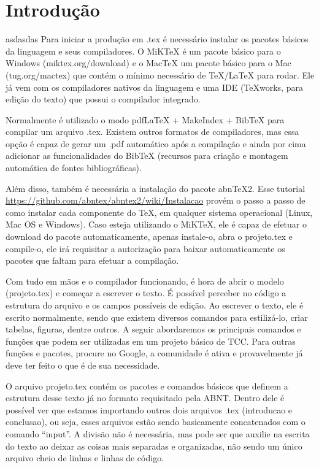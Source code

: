 \chapter{Introdução}
\label{c.introducao}

asdasdas Para iniciar a produção em .tex é necessário instalar os pacotes básicos da linguagem e seus compiladores. O MiKTeX é um pacote básico para o Windows (miktex.org/download) e o MacTeX um pacote básico para o Mac (tug.org/mactex) que contém o mínimo necessário de TeX/LaTeX para rodar. Ele já vem com os compiladores nativos da linguagem e uma IDE (TeXworks, para edição do texto) que possui o compilador integrado.

Normalmente é utilizado o modo pdfLaTeX + MakeIndex + BibTeX para compilar um arquivo .tex. Existem outros formatos de compiladores, mas essa opção é capaz de gerar um .pdf automático após a compilação e ainda por cima adicionar as funcionalidades do BibTeX (recursos para criação e montagem automática de fontes bibliográficas).

Além disso, também é necessária a instalação do pacote abnTeX2. Esse tutorial \url{https://github.com/abntex/abntex2/wiki/Instalacao} provém o passo a passo de como instalar cada componente do TeX, em qualquer sistema operacional (Linux, Mac OS e Windows). Caso esteja utilizando o MiKTeX, ele é capaz de efetuar o download do pacote automaticamente, apenas instale-o, abra o projeto.tex e compile-o, ele irá requisitar a autorização para baixar automaticamente os pacotes que faltam para efetuar a compilação.

Com tudo em mãos e o compilador funcionando, é hora de abrir o modelo (projeto.tex) e começar a escrever o texto. É possível perceber no código a estrutura do arquivo e os campos possíveis de edição. Ao escrever o texto, ele é escrito normalmente, sendo que existem diversos comandos para estilizá-lo, criar tabelas, figuras, dentre outros. A seguir abordaremos os principais comandos e funções que podem ser utilizadas em um projeto básico de TCC. Para outras funções e pacotes, procure no Google, a comunidade é ativa e provavelmente já deve ter feito o que é de sua necessidade.

O arquivo projeto.tex contém os pacotes e comandos básicos que definem a estrutura desse texto já no formato requisitado pela ABNT. Dentro dele é possível ver que estamos importando outros dois arquivos .tex (introducao e conclusao), ou seja, esses arquivos estão sendo basicamente concatenados com o comando ``input''. A divisão não é necessária, mas pode ser que auxilie na escrita do texto  ao deixar as coisas mais separadas e organizadas, não sendo um único arquivo cheio de linhas e linhas de código.

